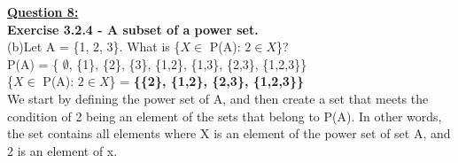 \documentclass[12pt, letterpaper, twoside]{article}
\begin{document}
\newpage
\noindent \textbf{\underline{Question 8:}}\\
\textbf{Exercise 3.2.4 - A subset of a power set.}\\
\break
(b)Let A = \{1, 2, 3\}. What is \{$X \in$ P(A): $2 \in X$\}?\\
\break
P(A) =  \{ $\emptyset$, \{1\}, \{2\}, \{3\}, \{1,2\}, \{1,3\}, \{2,3\}, \{1,2,3\}\}\\
\break
\{$X \in$ P(A): $2 \in X$\} = \textbf{\{\{2\}, \{1,2\}, \{2,3\}, \{1,2,3\}\}}\\
\break
We start by defining the power set of A, and then create a set that meets the condition of 2 being an element of the sets that belong to P(A). In other words, the set contains all elements where X is an element of the power set of set A, and 2 is an element of x.\\
\end{document}
